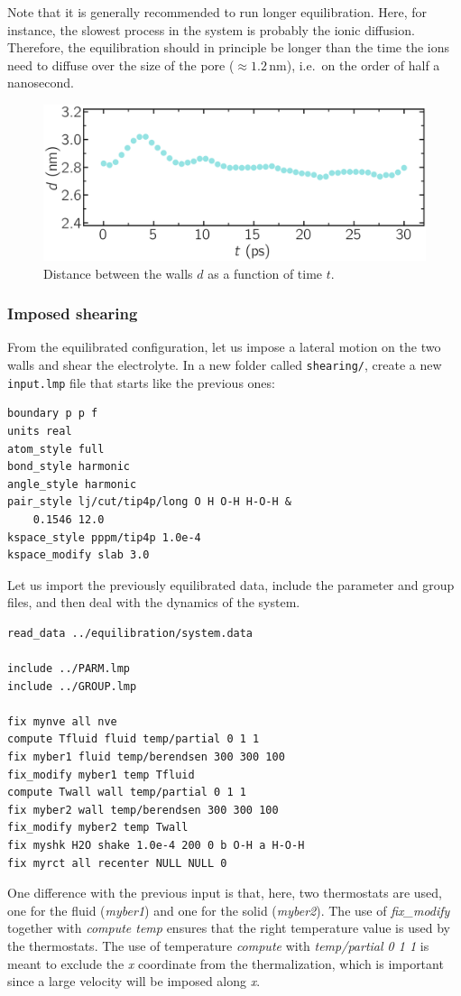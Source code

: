 \documentclass[9pt,tutorial]{livecoms}
\newcommand{\flrcmd}[1]{\textcolor{command}{\texttt{#1}}} %
\newcommand{\flecmd}[1]{\textcolor{command}{\texttt{#1}}} %
\begin{document}
Note that it is generally recommended to run longer equilibration. Here, for
instance, the slowest process in the system is probably the ionic diffusion.
Therefore, the equilibration should in principle be longer than the time
the ions need to diffuse over the size of the pore ($\approx 1.2\,\text{nm}$),
i.e.~on the order of half a nanosecond.

\begin{figure}
\centering
\includegraphics[width=\linewidth]{NANOSHEAR-equilibration}
\caption{Distance between the walls $d$ as a function of time $t$.}
\label{fig:NANOSHEAR-equilibration}
\end{figure}

\subsubsection{Imposed shearing}

From the equilibrated configuration, let us impose a lateral motion on the two
walls and shear the electrolyte. In a new folder called \flrcmd{shearing/},
create a new \flecmd{input.lmp} file that starts like the previous ones:
\begin{lstlisting}
boundary p p f
units real
atom_style full
bond_style harmonic
angle_style harmonic
pair_style lj/cut/tip4p/long O H O-H H-O-H &
    0.1546 12.0
kspace_style pppm/tip4p 1.0e-4
kspace_modify slab 3.0
\end{lstlisting}
Let us import the previously equilibrated data, include the parameter and group
files, and then deal with the dynamics of the system.
\begin{lstlisting}
read_data ../equilibration/system.data

include ../PARM.lmp
include ../GROUP.lmp

fix mynve all nve
compute Tfluid fluid temp/partial 0 1 1
fix myber1 fluid temp/berendsen 300 300 100
fix_modify myber1 temp Tfluid
compute Twall wall temp/partial 0 1 1
fix myber2 wall temp/berendsen 300 300 100
fix_modify myber2 temp Twall
fix myshk H2O shake 1.0e-4 200 0 b O-H a H-O-H
fix myrct all recenter NULL NULL 0
\end{lstlisting}
One difference with the previous input is that, here, two thermostats are used,
one for the fluid (\textit{myber1}) and one for the solid (\textit{myber2}).
The use of \textit{fix\_modify} together with \textit{compute temp} ensures
that the right temperature value is used by the thermostats. The use of
temperature \textit{compute} with \textit{temp/partial 0 1 1} is meant to exclude
the \textit{x} coordinate from the thermalization, which is important since a
large velocity will be imposed along \textit{x}.
\end{document}
